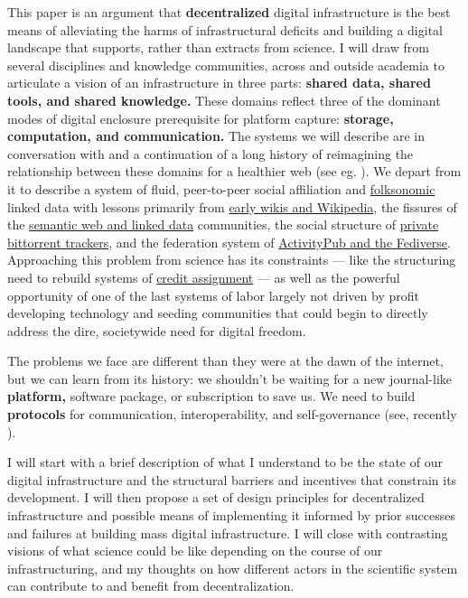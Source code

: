 \documentclass[10pt]{article}
\begin{document}
\begin{multicols}{2}
This paper is an argument that \textbf{decentralized} digital
infrastructure is the best means of alleviating the harms of
infrastructural deficits and building a digital landscape that supports,
rather than extracts from science. I will draw from several disciplines
and knowledge communities, across and outside academia to articulate a
vision of an infrastructure in three parts: \textbf{shared data, shared
tools, and shared knowledge.} These domains reflect three of the
dominant modes of digital enclosure prerequisite for platform capture:
\textbf{storage, computation, and communication.} The systems we will
describe are in conversation with and a continuation of a long history
of reimagining the relationship between these domains for a healthier
web (see eg. \cite{berners-leeSociallyAwareCloud2009, berners-leeWebServicesOverview2009} ). We depart from it to describe
a system of fluid, peer-to-peer social affiliation and
\protect\hyperlink{federated-systems-of-language}{folksonomic} linked
data with lessons primarily from \protect\hyperlink{the-wiki-way}{early
wikis and Wikipedia}, the fissures of the
\protect\hyperlink{neatness-vs-scruffiness}{semantic web and linked
data} communities, the social structure of
\protect\hyperlink{archives-need-communities}{private bittorrent
trackers}, and the federation system of
\protect\hyperlink{forums--feeds}{ActivityPub and the Fediverse}.
Approaching this problem from science has its constraints --- like the
structuring need to rebuild systems of
\protect\hyperlink{credit-assignment}{credit assignment} --- as well as
the powerful opportunity of one of the last systems of labor largely not
driven by profit developing technology and seeding communities that
could begin to directly address the dire, societywide need for digital
freedom.

The problems we face are different than they were at the dawn of the
internet, but we can learn from its history: we shouldn't be waiting for
a new journal-like \textbf{platform,} software package, or subscription
to save us. We need to build \textbf{protocols} for communication,
interoperability, and self-governance (see, recently \cite{brembsReplacingAcademicJournals2021} ).

I will start with a brief description of what I understand to be the
state of our digital infrastructure and the structural barriers and
incentives that constrain its development. I will then propose a set of
design principles for decentralized infrastructure and possible means of
implementing it informed by prior successes and failures at building
mass digital infrastructure. I will close with contrasting visions of
what science could be like depending on the course of our
infrastructuring, and my thoughts on how different actors in the
scientific system can contribute to and benefit from decentralization.


\end{multicols}
\end{document}
